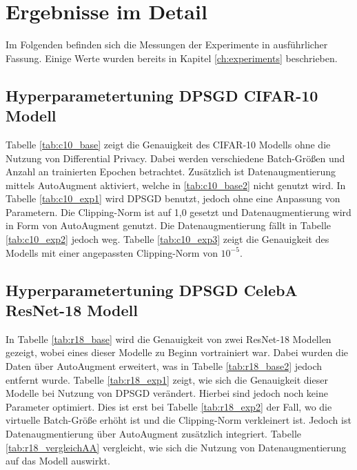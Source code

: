 \chapter{Ergebnisse im Detail}\label{ch:ergebnisse_detail}
Im Folgenden befinden sich die Messungen der Experimente in ausführlicher Fassung.
Einige Werte wurden bereits in Kapitel \ref{ch:experiments} beschrieben.

\section{Hyperparametertuning DPSGD CIFAR-10 Modell}
Tabelle \ref{tab:c10_base} zeigt die Genauigkeit des CIFAR-10 Modells ohne die Nutzung von Differential Privacy.
Dabei werden verschiedene Batch-Größen und Anzahl an trainierten Epochen betrachtet.
Zusätzlich ist Datenaugmentierung mittels AutoAugment aktiviert, welche in \ref{tab:c10_base2} nicht genutzt wird.
In Tabelle \ref{tab:c10_exp1} wird DPSGD benutzt, jedoch ohne eine Anpassung von Parametern. 
Die Clipping-Norm ist auf 1,0 gesetzt und Datenaugmentierung wird in Form von AutoAugment genutzt.
Die Datenaugmentierung fällt in Tabelle \ref{tab:c10_exp2} jedoch weg.
Tabelle \ref{tab:c10_exp3} zeigt die Genauigkeit des Modells mit einer angepassten Clipping-Norm von $10^{-5}$.





\clearpage

\section{Hyperparametertuning DPSGD CelebA ResNet-18 Modell}
In Tabelle \ref{tab:r18_base} wird die Genauigkeit von zwei ResNet-18 Modellen gezeigt, wobei eines dieser Modelle zu Beginn vortrainiert war.
Dabei wurden die Daten über AutoAugment erweitert, was in Tabelle \ref{tab:r18_base2} jedoch entfernt wurde.
Tabelle \ref{tab:r18_exp1} zeigt, wie sich die Genauigkeit dieser Modelle bei Nutzung von DPSGD verändert. 
Hierbei sind jedoch noch keine Parameter optimiert.
Dies ist erst bei Tabelle \ref{tab:r18_exp2} der Fall, wo die virtuelle Batch-Größe erhöht ist und die Clipping-Norm verkleinert ist.
Jedoch ist Datenaugmentierung über AutoAugment zusätzlich integriert.
Tabelle \ref{tab:r18_vergleichAA} vergleicht, wie sich die Nutzung von Datenaugmentierung auf das Modell auswirkt.





\clearpage


